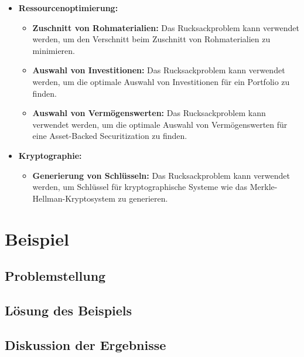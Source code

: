 \documentclass[12pt]{report}
\begin{document}
	\begin{itemize}
		\item \textbf{Ressourcenoptimierung:}
		\begin{itemize}
			\item \textbf{Zuschnitt von Rohmaterialien:} Das Rucksackproblem kann verwendet werden, um den Verschnitt beim Zuschnitt von Rohmaterialien zu minimieren.\cite{kellerer2004knapsack} 
			\item \textbf{Auswahl von Investitionen:} Das Rucksackproblem kann verwendet werden, um die optimale Auswahl von Investitionen für ein Portfolio zu finden.\cite{kellerer2004knapsack}
			\item \textbf{Auswahl von Vermögenswerten:} Das Rucksackproblem kann verwendet werden, um die optimale Auswahl von Vermögenswerten für eine Asset-Backed Securitization zu finden.\cite{kellerer2004knapsack}
		\end{itemize}
		\item \textbf{Kryptographie:}
		\begin{itemize}
			\item \textbf{Generierung von Schlüsseln:} Das Rucksackproblem kann verwendet werden, um Schlüssel für kryptographische Systeme wie das Merkle-Hellman-Kryptosystem zu generieren.\cite{kellerer2004knapsack}
		\end{itemize}
	\end{itemize}


	\section{Beispiel}
		\subsection{Problemstellung}
		
		\subsection{Lösung des Beispiels}
		
		\subsection{Diskussion der Ergebnisse}

\newpage
\end{document}
